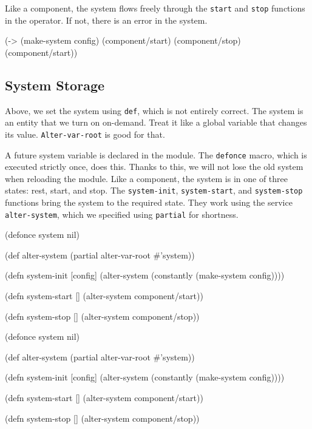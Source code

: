 \fi

Like a component, the system flows freely through the \verb|start| and \verb|stop| functions in the \arr operator. If not, there is an error in the system.

\begin{english}
  \begin{clojure}
(-> (make-system config)
    (component/start)
    (component/stop)
    (component/start))
  \end{clojure}
\end{english}

\subsection{System Storage}


Above, we set the system using \verb|def|, which is not entirely correct. The system is an entity that we turn on on-demand. Treat it like a global variable that changes its value. \verb|Alter-var-root| is good for that.

A future system variable is declared in the module. The \verb|defonce| macro, which is executed strictly once, does this. Thanks to this, we will not lose the old system when reloading the module. Like a component, the system is in one of three states: rest, start, and stop. The \verb|system-init|, \verb|system-start|, and \verb|system-stop| functions bring the system to the required state. They work using the service \verb|alter-system|, which we specified using \verb|partial| for shortness.


\ifnarrow

\begin{english}
  \begin{clojure}
(defonce system nil)

(def alter-system
  (partial alter-var-root #'system))

(defn system-init [config]
  (alter-system
    (constantly (make-system config))))

(defn system-start []
  (alter-system component/start))

(defn system-stop []
  (alter-system component/stop))
  \end{clojure}
\end{english}

\else

\begin{english}
  \begin{clojure}
(defonce system nil)

(def alter-system (partial alter-var-root #'system))

(defn system-init [config]
  (alter-system (constantly (make-system config))))

(defn system-start []
  (alter-system component/start))

(defn system-stop []
  (alter-system component/stop))
  \end{clojure}
\end{english}

